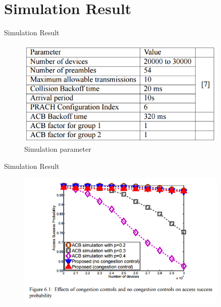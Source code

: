 \documentclass{beamer}
\begin{document}
\section{Simulation Result}
\begin{frame}{Simulation Result}
    \begin{figure}[t]
        \centering
        \includegraphics[width=0.9\textwidth]{figures/data.png}
        \caption{Simulation parameter}
    \end{figure}
\end{frame}
\begin{frame}{Simulation Result}
    \begin{figure}[t]
        \centering
        \includegraphics[width=0.9\textwidth]{figures/6_1.png}
    \end{figure}
\end{frame}
\end{document}
